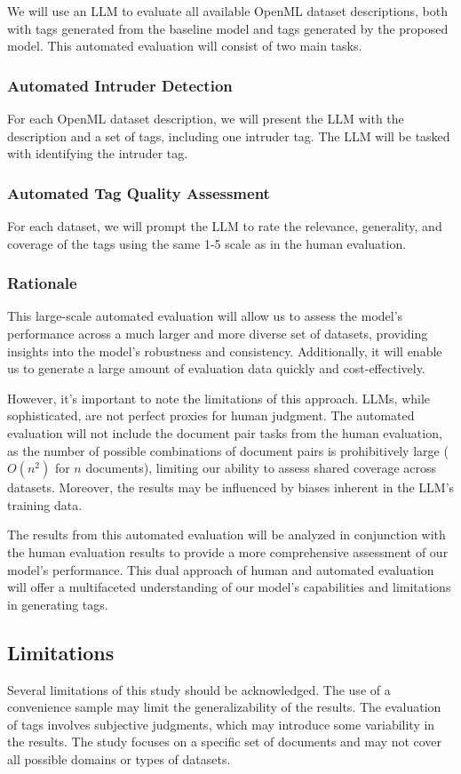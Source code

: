 We will use an LLM to evaluate all available OpenML dataset descriptions, both with tags generated from the baseline model and tags generated by the proposed model. This automated evaluation will consist of two main tasks.

\subsubsection{Automated Intruder Detection}
For each OpenML dataset description, we will present the LLM with the description and a set of tags, including one intruder tag. The LLM will be tasked with identifying the intruder tag.

\subsubsection{Automated Tag Quality Assessment}
For each dataset, we will prompt the LLM to rate the relevance, generality, and coverage of the tags using the same 1-5 scale as in the human evaluation.

\subsubsection{Rationale}
This large-scale automated evaluation will allow us to assess the model's performance across a much larger and more diverse set of datasets, providing insights into the model's robustness and consistency. Additionally, it will enable us to generate a large amount of evaluation data quickly and cost-effectively.

However, it's important to note the limitations of this approach. LLMs, while sophisticated, are not perfect proxies for human judgment. The automated evaluation will not include the document pair tasks from the human evaluation, as the number of possible combinations of document pairs is prohibitively large ($O(n^2)$ for $n$ documents), limiting our ability to assess shared coverage across datasets. Moreover, the results may be influenced by biases inherent in the LLM's training data.

The results from this automated evaluation will be analyzed in conjunction with the human evaluation results to provide a more comprehensive assessment of our model's performance. This dual approach of human and automated evaluation will offer a multifaceted understanding of our model's capabilities and limitations in generating tags.

\subsection{Limitations}
Several limitations of this study should be acknowledged. The use of a convenience sample may limit the generalizability of the results. The evaluation of tags involves subjective judgments, which may introduce some variability in the results. The study focuses on a specific set of documents and may not cover all possible domains or types of datasets.

